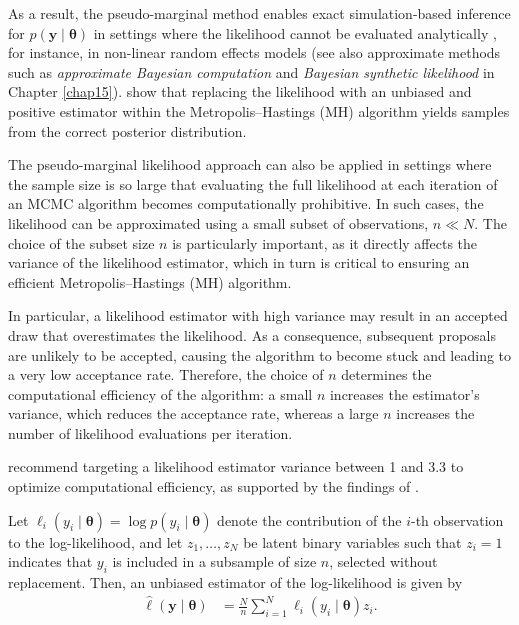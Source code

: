 As a result, the pseudo-marginal method enables exact simulation-based inference for \( p(\mathbf{y} \mid \boldsymbol{\theta}) \) in settings where the likelihood cannot be evaluated analytically \cite{andrieu2009pseudoefficient}, for instance, in non-linear random effects models (see also approximate methods such as \textit{approximate Bayesian computation} and \textit{Bayesian synthetic likelihood} in Chapter \ref{chap15}). \cite{andrieu2009pseudoefficient} show that replacing the likelihood with an unbiased and positive estimator within the Metropolis–Hastings (MH) algorithm yields samples from the correct posterior distribution.

The pseudo-marginal likelihood approach can also be applied in settings where the sample size is so large that evaluating the full likelihood at each iteration of an MCMC algorithm becomes computationally prohibitive. In such cases, the likelihood can be approximated using a small subset of observations, \( n \ll N \). The choice of the subset size \( n \) is particularly important, as it directly affects the variance of the likelihood estimator, which in turn is critical to ensuring an efficient Metropolis–Hastings (MH) algorithm.

In particular, a likelihood estimator with high variance may result in an accepted draw that overestimates the likelihood. As a consequence, subsequent proposals are unlikely to be accepted, causing the algorithm to become stuck and leading to a very low acceptance rate. Therefore, the choice of \( n \) determines the computational efficiency of the algorithm: a small \( n \) increases the estimator's variance, which reduces the acceptance rate, whereas a large \( n \) increases the number of likelihood evaluations per iteration.

\cite{quiroz2018subsampling} recommend targeting a likelihood estimator variance between 1 and 3.3 to optimize computational efficiency, as supported by the findings of \cite{pitt2012some}.

Let \( \ell_i(y_i \mid \boldsymbol{\theta}) = \log p(y_i \mid \boldsymbol{\theta}) \) denote the contribution of the \( i \)-th observation to the log-likelihood, and let \( z_1, \dots, z_N \) be latent binary variables such that \( z_i = 1 \) indicates that \( y_i \) is included in a subsample of size \( n \), selected without replacement. Then, an unbiased estimator of the log-likelihood is given by
\begin{align*}
	\hat{\ell}(\mathbf{y} \mid \boldsymbol{\theta}) & = \frac{N}{n} \sum_{i=1}^N \ell_i(y_i \mid \boldsymbol{\theta}) z_i.
\end{align*}

